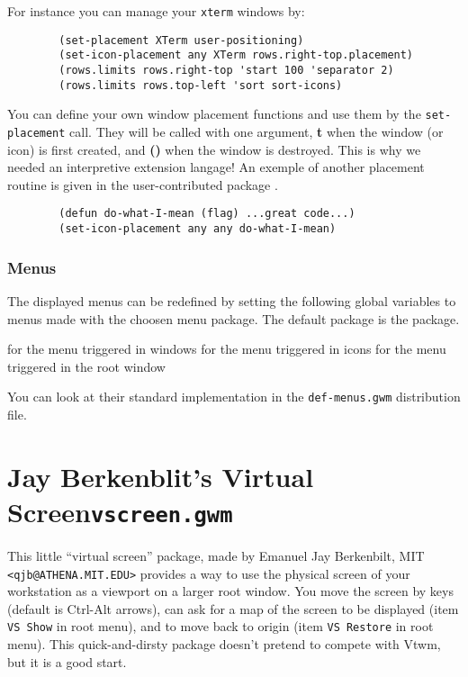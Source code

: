 For instance you can manage your \verb"xterm" windows by:

{\exemplefont\begin{verbatim}
        (set-placement XTerm user-positioning)
        (set-icon-placement any XTerm rows.right-top.placement)
        (rows.limits rows.right-top 'start 100 'separator 2)
        (rows.limits rows.top-left 'sort sort-icons)
\end{verbatim}}

You can define your own window placement functions and use them by the
\verb"set-placement" call. They will be called with one argument, {\bf t}
when the window (or icon) is first created, and {\bf ()} when the window is
destroyed. This is why we needed an interpretive extension langage! An exemple
of another placement routine is given in the user-contributed package
.

{\exemplefont\begin{verbatim}
        (defun do-what-I-mean (flag) ...great code...)
        (set-icon-placement any any do-what-I-mean)
\end{verbatim}}

\subsubsection{Menus}

The displayed menus can be redefined by setting the following global
variables to menus made with the choosen menu package. The default package
is the  package.

\begin{description}
 for the menu triggered in windows
 for the menu triggered in icons
 for the menu triggered in the root window
\end{description}

You can look at their standard implementation in the \verb"def-menus.gwm"
distribution file.

\section{Jay Berkenblit's Virtual Screen\hfill{\tt vscreen.gwm}}
\label{vscreen}

This little ``virtual screen'' package, made by Emanuel Jay Berkenbilt, MIT
\verb|<qjb@ATHENA.MIT.EDU>| provides a way to use the physical screen of your
workstation as a viewport on a larger root window. You move the screen by keys
(default is {\sc Ctrl-Alt} arrows), can ask for a map of the screen to be
displayed (item \verb|VS Show| in root menu), and to move back to origin (item
\verb|VS Restore| in root menu). This quick-and-dirsty package doesn't pretend
to compete with {\sc Vtwm}, but it is a good start.

